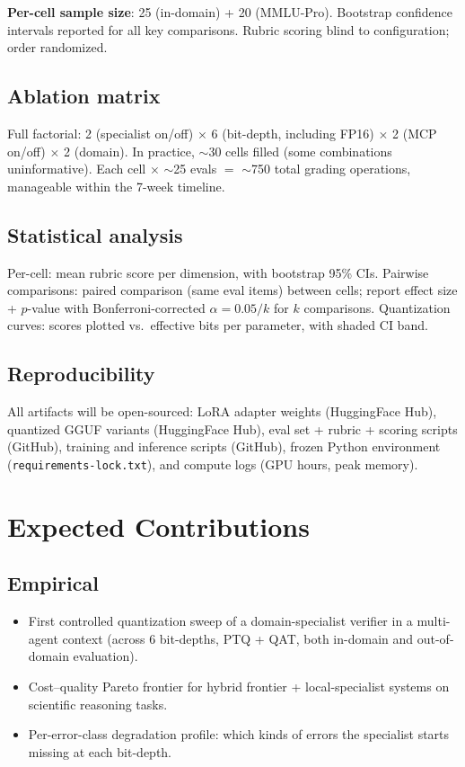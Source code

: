 \documentclass[11pt]{article}
\begin{document}
\textbf{Per-cell sample size}: 25 (in-domain) + 20 (MMLU-Pro). Bootstrap confidence intervals reported for all key comparisons. Rubric scoring blind to configuration; order randomized.

\subsection{Ablation matrix}

Full factorial: 2 (specialist on/off) $\times$ 6 (bit-depth, including FP16) $\times$ 2 (MCP on/off) $\times$ 2 (domain). In practice, $\sim$30 cells filled (some combinations uninformative). Each cell $\times$ $\sim$25 evals $=$ $\sim$750 total grading operations, manageable within the 7-week timeline.

\subsection{Statistical analysis}

Per-cell: mean rubric score per dimension, with bootstrap 95\% CIs. Pairwise comparisons: paired comparison (same eval items) between cells; report effect size + $p$-value with Bonferroni-corrected $\alpha = 0.05/k$ for $k$ comparisons. Quantization curves: scores plotted vs.\ effective bits per parameter, with shaded CI band.

\subsection{Reproducibility}

All artifacts will be open-sourced: LoRA adapter weights (HuggingFace Hub), quantized GGUF variants (HuggingFace Hub), eval set + rubric + scoring scripts (GitHub), training and inference scripts (GitHub), frozen Python environment (\texttt{requirements-lock.txt}), and compute logs (GPU hours, peak memory).

\section{Expected Contributions}

\subsection{Empirical}
\begin{itemize}
  \item First controlled quantization sweep of a domain-specialist verifier in a multi-agent context (across 6 bit-depths, PTQ + QAT, both in-domain and out-of-domain evaluation).
  \item Cost--quality Pareto frontier for hybrid frontier + local-specialist systems on scientific reasoning tasks.
  \item Per-error-class degradation profile: which kinds of errors the specialist starts missing at each bit-depth.
\end{itemize}
\end{document}
